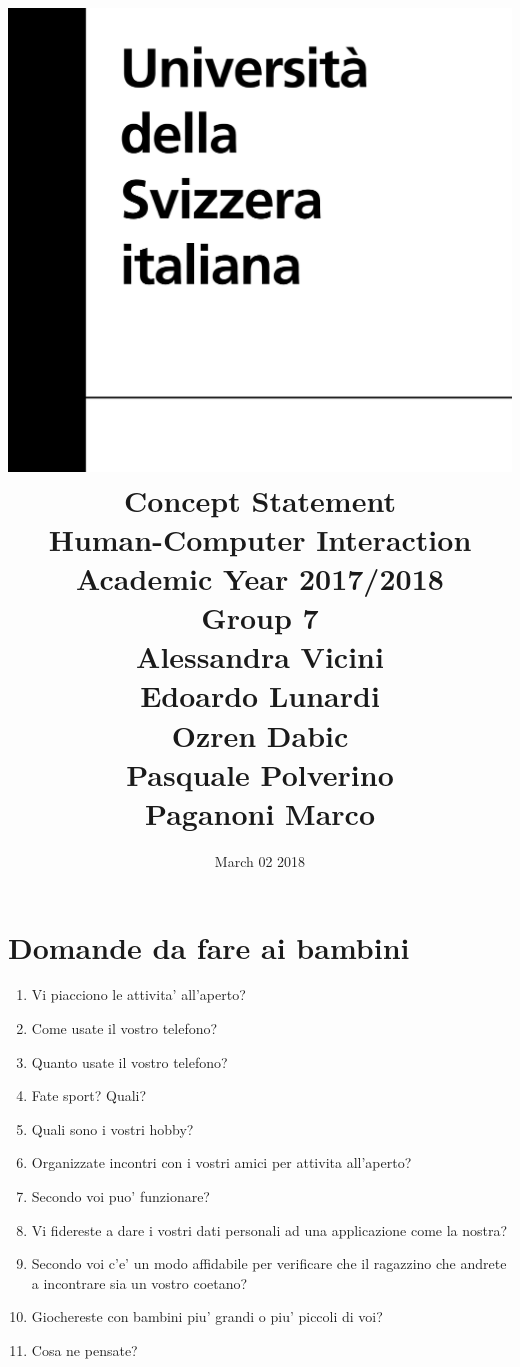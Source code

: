 \documentclass[12pt]{article}
\title {
\includegraphics[width = .2\linewidth]{University-of-Lugano.png} \break \break
{\bf\Huge Concept Statement}
\\\large Human-Computer Interaction
\\\small Academic Year 2017/2018 \break
\\\large \textbf{Group 7}
\\\large Alessandra Vicini \\ Edoardo Lunardi \\ Ozren Dabic \\ Pasquale Polverino \\ Paganoni Marco}
\date{March 02 2018}
\begin{document}
\maketitle
\thispagestyle{empty}

\newpage

\thispagestyle{empty}

\section*{Domande da fare ai bambini}
\begin{enumerate}
  \item Vi piacciono le attivita' all'aperto?
  \item Come usate il vostro telefono?
  \item Quanto usate il vostro telefono?
  \item Fate sport? Quali?
  \item Quali sono i vostri hobby?
  \item Organizzate incontri con i vostri amici per attivita all'aperto?
  \item Secondo voi puo' funzionare?
  \item Vi fidereste a dare i vostri dati personali ad una applicazione come la
    nostra?
  \item Secondo voi c'e' un modo affidabile per verificare che il ragazzino che
    andrete a incontrare sia un vostro coetano?
  \item Giochereste con bambini piu' grandi o piu' piccoli di voi?
  \item Cosa ne pensate?
\end{enumerate}
\end{document}
